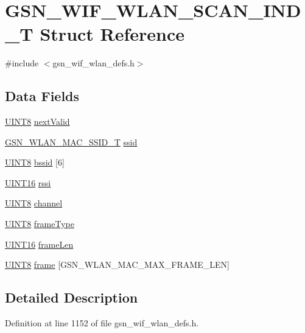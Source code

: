 \hypertarget{a00400}{
\section{GSN\_\-WIF\_\-WLAN\_\-SCAN\_\-IND\_\-T Struct Reference}
\label{a00400}
}


{\ttfamily \#include $<$gsn\_\-wif\_\-wlan\_\-defs.h$>$}

\subsection*{Data Fields}
\begin{DoxyCompactItemize}
\item 
\hyperlink{a00660_gab27e9918b538ce9d8ca692479b375b6a}{UINT8} \hyperlink{a00400_a9c89aaf009cfded452a388795b06318f}{nextValid}
\item 
\hyperlink{a00417}{GSN\_\-WLAN\_\-MAC\_\-SSID\_\-T} \hyperlink{a00400_a9bcb2e5a0dbdd5461faec24950cf7459}{ssid}
\item 
\hyperlink{a00660_gab27e9918b538ce9d8ca692479b375b6a}{UINT8} \hyperlink{a00400_af1eb240ad4299a104d0bf3fddcabbb95}{bssid} \mbox{[}6\mbox{]}
\item 
\hyperlink{a00660_ga09f1a1fb2293e33483cc8d44aefb1eb1}{UINT16} \hyperlink{a00400_a640aff00cf10c51413e56e7846dc5089}{rssi}
\item 
\hyperlink{a00660_gab27e9918b538ce9d8ca692479b375b6a}{UINT8} \hyperlink{a00400_a52d69a3bd7bdfdfc6f9e40f4962c575d}{channel}
\item 
\hyperlink{a00660_gab27e9918b538ce9d8ca692479b375b6a}{UINT8} \hyperlink{a00400_aa94997d83b2de77c11b392c55081d2a9}{frameType}
\item 
\hyperlink{a00660_ga09f1a1fb2293e33483cc8d44aefb1eb1}{UINT16} \hyperlink{a00400_ad7d37183f86bdd7a3c11db21c3301b32}{frameLen}
\item 
\hyperlink{a00660_gab27e9918b538ce9d8ca692479b375b6a}{UINT8} \hyperlink{a00400_a06d2b4d6364cb0449f64790ee601c187}{frame} \mbox{[}GSN\_\-WLAN\_\-MAC\_\-MAX\_\-FRAME\_\-LEN\mbox{]}
\end{DoxyCompactItemize}


\subsection{Detailed Description}


Definition at line 1152 of file gsn\_\-wif\_\-wlan\_\-defs.h.



